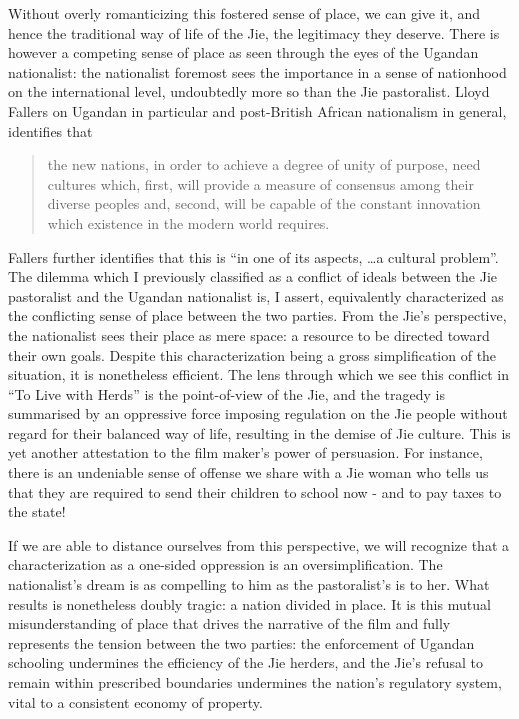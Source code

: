 \documentclass[12pt, letterpaper, oneside]{article}
\begin{document}
Without overly romanticizing this fostered sense of place, we can give it, and hence the traditional way of life of the Jie, the legitimacy they deserve. There is however a competing sense of place as seen through the eyes of the Ugandan nationalist: the nationalist foremost sees the importance in a sense of nationhood on the international level, undoubtedly more so than the Jie pastoralist. Lloyd Fallers on Ugandan in particular and post-British African nationalism in general, identifies that 
\begin{quote}
the new nations, in order to achieve a degree of unity of purpose, need cultures which, first, will provide a measure of consensus among their diverse peoples and, second, will be capable of the constant innovation which existence in the modern world requires. \autocite[677]{fallers1961ideology}
\end{quote}
Fallers further identifies that this is ``in one of its aspects, \ldots a cultural problem''. The dilemma which I previously classified as a conflict of ideals between the Jie pastoralist and the Ugandan nationalist is, I assert, equivalently characterized as the conflicting sense of place between the two parties. From the Jie's perspective, the nationalist sees their place as mere space: a resource to be directed toward their own goals. Despite this characterization being a gross simplification of the situation, it is nonetheless efficient. The lens through which we see this conflict in ``To Live with Herds'' is the point-of-view of the Jie, and the tragedy is summarised by an oppressive force imposing regulation on the Jie people without regard for their balanced way of life, resulting in the demise of Jie culture. This is yet another attestation to the film maker's power of persuasion. For instance, there is an undeniable sense of offense we share with a Jie woman who tells us that they are required to send their children to school now - and to pay taxes to the state!

If we are able to distance ourselves from this perspective, we will recognize that a characterization as a one-sided oppression is an oversimplification. The nationalist's dream is as compelling to him as the pastoralist's is to her. What results is nonetheless doubly tragic: a nation divided in place. It is this mutual misunderstanding of place that drives the narrative of the film and fully represents the tension between the two parties: the enforcement of Ugandan schooling undermines the efficiency of the Jie herders, and the Jie's refusal to remain within prescribed boundaries undermines the nation's regulatory system, vital to a consistent economy of property.
\end{document}
